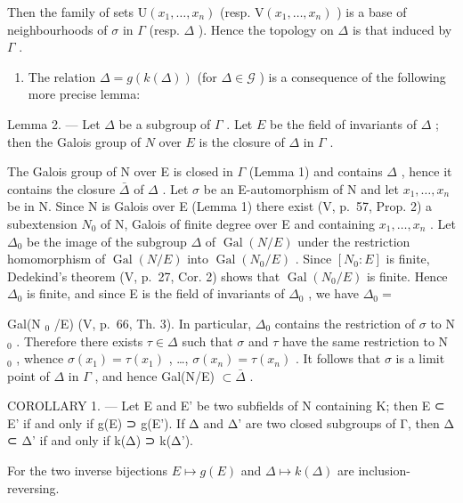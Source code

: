 Then the family of sets \(\mathrm{U}(x_{1},\ldots,x_{n})\) (resp. \(\mathrm{V}(x_{1},\ldots,x_{n})\) ) is a base of neighbourhoods of \(\sigma\) in \(\Gamma\) (resp. \(\Delta\) ). Hence the topology on \(\Delta\) is that induced by \(\Gamma\) .

\begin{enumerate}
\def\labelenumi{\Alph{enumi})}
\setcounter{enumi}{1}
\tightlist
\item
  The relation \(\Delta = g(k(\Delta))\) (for \(\Delta \in \mathcal{G}\) ) is a consequence of the following more precise lemma:
\end{enumerate}

Lemma 2. --- Let \(\Delta\) be a subgroup of \(\Gamma\) . Let \(E\) be the field of invariants of \(\Delta\) ; then the Galois group of \(N\) over \(E\) is the closure of \(\Delta\) in \(\Gamma\) .

The Galois group of N over E is closed in \(\Gamma\) (Lemma 1) and contains \(\Delta\) , hence it contains the closure \(\bar{\Delta}\) of \(\Delta\) . Let \(\sigma\) be an E-automorphism of N and let \(x_{1}, \ldots, x_{n}\) be in N. Since N is Galois over E (Lemma 1) there exist (V, p.~57, Prop. 2) a subextension \(N_{0}\) of N, Galois of finite degree over E and containing \(x_{1}, \ldots, x_{n}\) . Let \(\Delta_{0}\) be the image of the subgroup \(\Delta\) of \(\operatorname{Gal}(N/E)\) under the restriction homomorphism of \(\operatorname{Gal}(N/E)\) into \(\operatorname{Gal}(N_{0}/E)\) . Since \([N_{0}:E]\) is finite, Dedekind's theorem (V, p.~27, Cor. 2) shows that \(\operatorname{Gal}(N_{0}/E)\) is finite. Hence \(\Delta_{0}\) is finite, and since E is the field of invariants of \(\Delta_{0}\) , we have \(\Delta_{0}=\)

Gal(N \(_0\) /E) (V, p.~66, Th. 3). In particular, \(\Delta_0\) contains the restriction of \(\sigma\) to N \(_0\) . Therefore there exists \(\tau \in \Delta\) such that \(\sigma\) and \(\tau\) have the same restriction to N \(_0\) , whence \(\sigma(x_1) = \tau(x_1)\) , \ldots, \(\sigma(x_n) = \tau(x_n)\) . It follows that \(\sigma\) is a limit point of \(\Delta\) in \(\Gamma\) , and hence Gal(N/E) \(\subset \bar{\Delta}\) .

COROLLARY 1. --- Let E and E' be two subfields of N containing K; then E ⊂ E' if and only if g(E) ⊃ g(E'). If Δ and Δ' are two closed subgroups of Γ, then Δ ⊂ Δ' if and only if k(Δ) ⊃ k(Δ').

For the two inverse bijections \(E \mapsto g(E)\) and \(\Delta \mapsto k(\Delta)\) are inclusion-reversing.

